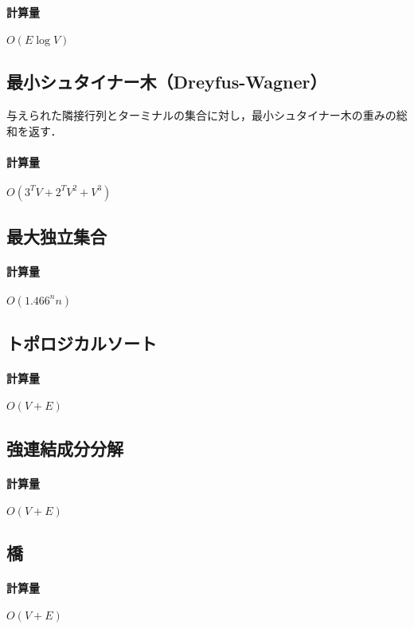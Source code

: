 \documentclass[landscape,twocolumn,9pt]{jsarticle}
\begin{document}
\paragraph{計算量} $O(E\log V)$


\subsection{最小シュタイナー木（Dreyfus-Wagner）}
与えられた隣接行列とターミナルの集合に対し，最小シュタイナー木の重みの総和を返す．

\paragraph{計算量} $O(3^TV+2^TV^2+V^3)$


\subsection{最大独立集合}
\paragraph{計算量} $O(1.466^n n)$


\subsection{トポロジカルソート}
\paragraph{計算量} $O(V+E)$


\subsection{強連結成分分解}
\paragraph{計算量} $O(V+E)$


\subsection{橋}
\paragraph{計算量} $O(V+E)$

\end{document}

